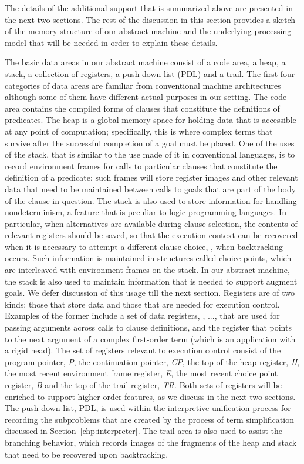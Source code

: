 The details of the additional support that is summarized above are
presented in the next two sections.
The rest of the discussion in this section provides a sketch of the memory
structure of our abstract machine and the underlying processing model
that will be needed in order to explain these details.

The basic data areas in our abstract machine consist of a code area,
a heap, a stack, a collection
of registers, a push down list (PDL) and a trail.
The first four categories of data areas are familiar from conventional
machine architectures although some of them have different actual
purposes in our setting.
The code area contains the compiled forms of clauses that constitute
the definitions of predicates.
The heap is a global memory space for holding data
that is accessible at any point of computation; specifically, this is
where complex terms that survive after the successful completion of a
goal must be placed. One of the uses of the stack, that is similar to
the use made of it in conventional languages, is to record environment
frames for calls to particular clauses that constitute the definition
of a predicate; such frames will store register images and other
relevant data that need to be maintained between calls to goals that
are part of the body of the clause in question.
The stack is also used to store information for handling
nondeterminism, a feature that is peculiar
to logic programming languages.
In particular, when alternatives are available during clause selection,
the contents of relevant registers should be saved,
so that the execution context can be recovered when it is necessary to
attempt a different clause choice, \ie, when backtracking
occurs. Such information is maintained
in structures called  choice points, which are interleaved with
environment frames on the stack.
In our abstract machine, the
stack is also used to maintain information that is needed to support
augment goals. We defer discussion of this usage till the next
section.
Registers are of two kinds: those that store data and those that
are needed for execution control.
Examples of the former include a set of data registers, , ...,  that
are used for passing arguments across calls to clause definitions, and
the  register that points to the next argument of a complex
first-order term (which is an application with a rigid head).
The set of registers relevant to execution control consist of the program
pointer, {\it P}, the continuation pointer, {\it CP}, the top of the
heap register,
{\it H}, the most recent environment frame register,
{\it E}, the most recent choice point register, {\it B} and the top of
the trail register, {\it TR}.
Both sets of registers will be enriched to support higher-order
features, as we discuss in the next two sections.
The push down list, PDL, is used within the interpretive
unification process for recording the subproblems that are created by
the process of term simplification discussed in
Section~\ref{chp:interpreter}.
The trail area is also used to
assist the branching behavior, which records images of the fragments
of the heap and stack that need to be recovered upon backtracking.

